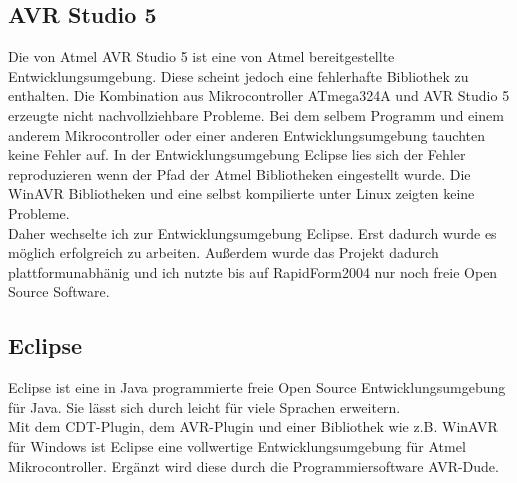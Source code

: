 \subsection{AVR Studio 5}
Die von Atmel AVR Studio 5 ist eine von Atmel bereitgestellte Entwicklungsumgebung. Diese scheint jedoch eine fehlerhafte Bibliothek zu enthalten. Die Kombination aus Mikrocontroller ATmega324A und AVR Studio 5 erzeugte nicht nachvollziehbare Probleme. Bei dem selbem Programm und einem anderem Mikrocontroller oder einer anderen Entwicklungsumgebung tauchten keine Fehler auf.
In der Entwicklungsumgebung Eclipse lies sich der Fehler reproduzieren wenn der Pfad der Atmel Bibliotheken eingestellt wurde. Die WinAVR Bibliotheken und eine selbst kompilierte  unter Linux zeigten keine Probleme.\\
Daher wechselte ich zur  Entwicklungsumgebung Eclipse. Erst dadurch wurde es möglich erfolgreich zu arbeiten. Außerdem wurde das Projekt dadurch plattformunabhänig und ich nutzte bis auf RapidForm2004 nur noch freie Open Source Software.\\
\subsection{Eclipse}
Eclipse ist eine in Java programmierte freie Open Source Entwicklungsumgebung für Java. Sie lässt sich durch  leicht für viele Sprachen erweitern.\\
Mit dem CDT-Plugin, dem AVR-Plugin und einer Bibliothek wie z.B. WinAVR für Windows ist Eclipse eine vollwertige Entwicklungsumgebung für Atmel Mikrocontroller. 
Ergänzt wird diese durch die Programmiersoftware AVR-Dude.\\




